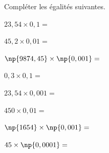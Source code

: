 \documentclass[a4paper]{book}
\begin{document}
    \begin{exemple}
        Compléter les égalités suivantes.

        \bigskip

        \begin{minipage}{0.23\linewidth}
            $23,54\times 0,1 = $ 

            \bigskip

            $45,2 \times 0,01 = $
        \end{minipage}
        \hfill \vline \hfill
        \begin{minipage}{0.23\linewidth}
            $\np{9874,45}\times \np{0,001} = $ 

            \bigskip

            $0,3 \times 0,1 = $
        \end{minipage}
        \hfill \vline \hfill
        \begin{minipage}{0.23\linewidth}
            $23,54\times 0,001 = $ 

            \bigskip

            $450 \times 0,01 = $
        \end{minipage}
        \hfill \vline \hfill
        \begin{minipage}{0.23\linewidth}
            $\np{1654}\times \np{0,001} = $ 

            \bigskip

            $45 \times \np{0,0001} = $
        \end{minipage}
    \end{exemple}
\end{document}
